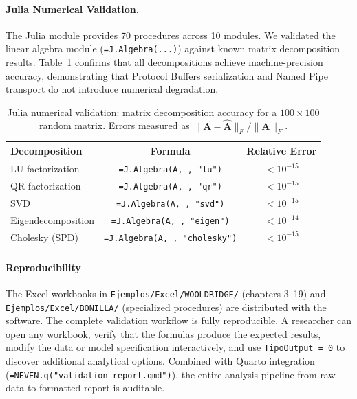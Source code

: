 \paragraph{Julia Numerical Validation.}
The Julia module provides 70 procedures across 10 modules. We validated the linear algebra module (\texttt{=J.Algebra(...)}) against known matrix decomposition results. Table~\ref{tab:julia_validation} confirms that all decompositions achieve machine-precision accuracy, demonstrating that Protocol Buffers serialization and Named Pipe transport do not introduce numerical degradation.

\begin{table}[htbp]
\centering
\caption{Julia numerical validation: matrix decomposition accuracy for a $100 \times 100$ random matrix. Errors measured as $\|\mathbf{A} - \hat{\mathbf{A}}\|_F / \|\mathbf{A}\|_F$.}
\label{tab:julia_validation}
\begin{tabular}{@{}lcc@{}}
\toprule
\textbf{Decomposition} & \textbf{\neven{} Formula} & \textbf{Relative Error} \\
\midrule
LU factorization    & \texttt{=J.Algebra(A, , "lu")}  & $< 10^{-15}$ \\
QR factorization    & \texttt{=J.Algebra(A, , "qr")}  & $< 10^{-15}$ \\
SVD                 & \texttt{=J.Algebra(A, , "svd")} & $< 10^{-15}$ \\
Eigendecomposition  & \texttt{=J.Algebra(A, , "eigen")} & $< 10^{-14}$ \\
Cholesky (SPD)      & \texttt{=J.Algebra(A, , "cholesky")} & $< 10^{-15}$ \\
\bottomrule
\end{tabular}
\end{table}

\paragraph{Reproducibility}
The Excel workbooks in \texttt{Ejemplos/Excel/WOOLDRIDGE/} (chapters 3--19) and \texttt{Ejemplos/Excel/BONILLA/} (specialized procedures) are distributed with the software. The complete validation workflow is fully reproducible. A researcher can open any workbook, verify that the formulas produce the expected results, modify the data or model specification interactively, and use \texttt{TipoOutput = 0} to discover additional analytical options. Combined with Quarto integration (\texttt{=NEVEN.q("validation\_report.qmd")}), the entire analysis pipeline from raw data to formatted report is auditable.

